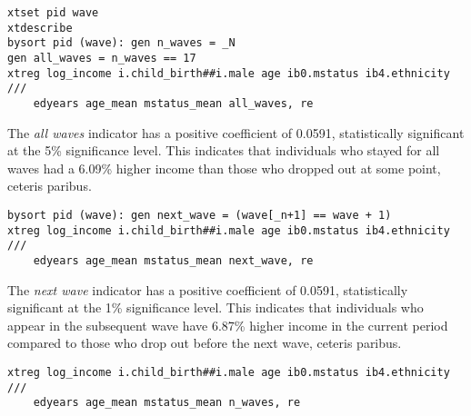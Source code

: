 

\vspace{-1em}

\begin{verbatim}
xtset pid wave
xtdescribe
bysort pid (wave): gen n_waves = _N
gen all_waves = n_waves == 17
xtreg log_income i.child_birth##i.male age ib0.mstatus ib4.ethnicity ///
    edyears age_mean mstatus_mean all_waves, re
\end{verbatim}

\vspace{-1em}


\vspace{-1em}

The \emph{all waves} indicator has a positive coefficient of 0.0591, statistically significant at the 5\% significance level. This indicates that individuals who stayed for all waves had a 6.09\% higher income than those who dropped out at some point, ceteris paribus.

\vspace{-1em}

\begin{verbatim}
bysort pid (wave): gen next_wave = (wave[_n+1] == wave + 1)
xtreg log_income i.child_birth##i.male age ib0.mstatus ib4.ethnicity ///
    edyears age_mean mstatus_mean next_wave, re
\end{verbatim}

\vspace{-1em}


The \emph{next wave} indicator has a positive coefficient of 0.0591, statistically significant at the 1\% significance level. This indicates that individuals who appear in the subsequent wave have 6.87\% higher income in the current period compared to those who drop out before the next wave, ceteris paribus.

\begin{verbatim}
xtreg log_income i.child_birth##i.male age ib0.mstatus ib4.ethnicity ///
    edyears age_mean mstatus_mean n_waves, re
\end{verbatim}

